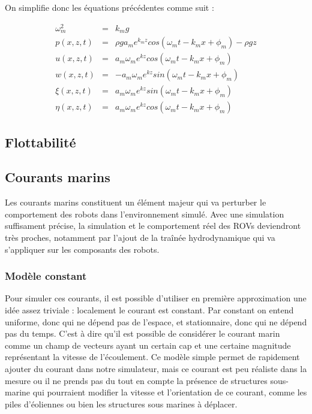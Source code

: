 				On simplifie donc les équations précédentes comme suit :
			
				\begin{eqnarray}
					\omega_m^2 & = & k_mg \\
					p(x, z, t) & = & \rho g a_m e^{k_mz}cos(\omega_mt - k_mx + \phi_m) - \rho g z\\
					u(x, z, t) & = & a_m \omega_m e^{kz}cos(\omega_mt -k_mx + \phi_m) \\
					w(x, z, t) & = & - a_m \omega_m e^{kz}sin(\omega_mt -k_mx + \phi_m) \\
					\xi(x, z, t) & = & a_m \omega_m e^{kz}sin(\omega_mt -k_mx + \phi_m) \\
					\eta(x, z, t) & = & a_m \omega_m e^{kz}cos(\omega_mt -k_mx + \phi_m)
				\end{eqnarray}

		\subsection{Flottabilité}

		\subsection{Courants marins}

			Les courants marins constituent un élément majeur qui va perturber le comportement des robots dans l'environnement simulé. Avec une simulation suffisament précise, la simulation et le comportement réel des \gls{ROV}s deviendront très proches, notamment par l'ajout de la traînée hydrodynamique qui va s'appliquer sur les composants des robots.

			\subsubsection{Modèle constant}

				Pour simuler ces courants, il est possible d'utiliser en première approximation une idée assez triviale : localement le courant est constant. Par constant on entend uniforme, donc qui ne dépend pas de l'espace, et stationnaire, donc qui ne dépend pas du temps. C'est à dire qu'il est possible de considérer le courant marin  comme un champ de vecteurs ayant un certain cap et une certaine magnitude représentant la vitesse de l'écoulement. Ce modèle simple permet de rapidement ajouter du courant dans notre simulateur, mais ce courant est peu réaliste dans la mesure ou il ne prends pas du tout en compte la présence de structures sous-marine qui pourraient modifier la vitesse et l'orientation de ce courant, comme les piles d'éoliennes ou bien les structures sous marines à déplacer.

